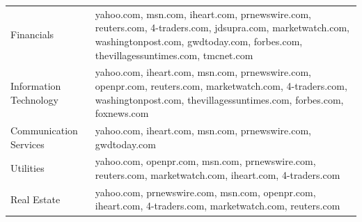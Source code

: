 \begin{longtable}{@{}p{2.5cm} | p{12.6cm}@{}}
Financials
& yahoo.com, msn.com, iheart.com, prnewswire.com, reuters.com, 4-traders.com, jdsupra.com, marketwatch.com, washingtonpost.com, gwdtoday.com, forbes.com, thevillagessuntimes.com, tmcnet.com \\

Information Technology
& yahoo.com, iheart.com, msn.com, prnewswire.com, openpr.com, reuters.com, marketwatch.com, 4-traders.com, washingtonpost.com, thevillagessuntimes.com, forbes.com, foxnews.com \\

Communication Services
& yahoo.com, iheart.com, msn.com, prnewswire.com, gwdtoday.com \\

Utilities
& yahoo.com, openpr.com, msn.com, prnewswire.com, reuters.com, marketwatch.com, iheart.com, 4-traders.com \\

Real Estate
& yahoo.com, prnewswire.com, msn.com, openpr.com, iheart.com, 4-traders.com, marketwatch.com, reuters.com \\

\bottomrule
\end{longtable}











